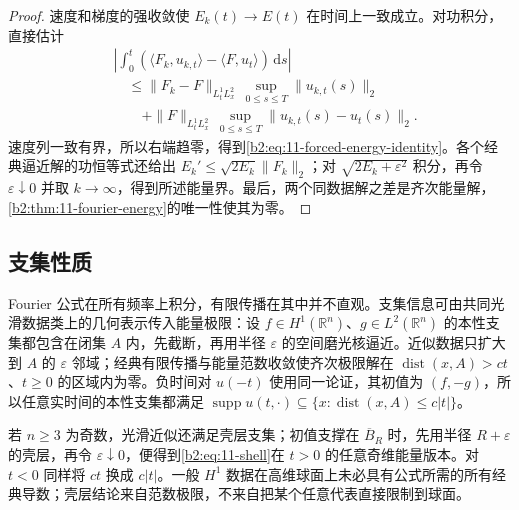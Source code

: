\begin{proof}
速度和梯度的强收敛使 \(E_k(t)\to E(t)\) 在时间上一致成立。对功积分，直接估计
\[
 \begin{aligned}
 &\left|\int_0^t\left(\langle F_k,u_{k,t}\rangle
                         -\langle F,u_t\rangle\right)\,\mathrm{d}s\right|\\
 &\quad\leq\|F_k-F\|_{L^1_tL^2_x}\,
                 \sup_{0\leq s\leq T}\|u_{k,t}(s)\|_2\\
 &\qquad+\|F\|_{L^1_tL^2_x}\,
                 \sup_{0\leq s\leq T}\|u_{k,t}(s)-u_t(s)\|_2.
 \end{aligned}
\]
速度列一致有界，所以右端趋零，得到\eqref{b2:eq:11-forced-energy-identity}。各个经典逼近解的功恒等式还给出 \(E_k'\leq\sqrt{2E_k}\|F_k\|_2\)；对 \(\sqrt{2E_k+\varepsilon^2}\) 积分，再令 \(\varepsilon\downarrow0\) 并取 \(k\to\infty\)，得到所述能量界。最后，两个同数据解之差是齐次能量解，\cref{b2:thm:11-fourier-energy}的唯一性使其为零。
\end{proof}

\subsection{支集性质}
\label{b2:subsec:110304}

Fourier 公式在所有频率上积分，有限传播在其中并不直观。支集信息可由共同光滑数据类上的几何表示传入能量极限：设 \(f\in H^1(\mathbb R^n)\)、\(g\in L^2(\mathbb R^n)\) 的本性支集都包含在闭集 \(A\) 内，先截断，再用半径 \(\varepsilon\) 的空间磨光核逼近。近似数据只扩大到 \(A\) 的 \(\varepsilon\) 邻域；经典有限传播与能量范数收敛使齐次极限解在 \(\operatorname{dist}(x,A)>ct\)、\(t\geq0\) 的区域内为零。负时间对 \(u(-t)\) 使用同一论证，其初值为 \((f,-g)\)，所以任意实时间的本性支集都满足 \(\operatorname{supp}u(t,\cdot)\subseteq\{x:\operatorname{dist}(x,A)\leq c|t|\}\)。

\ProseParagraphBreak

若 \(n\geq3\) 为奇数，光滑近似还满足壳层支集；初值支撑在 \(\overline B_R\) 时，先用半径 \(R+\varepsilon\) 的壳层，再令 \(\varepsilon\downarrow0\)，便得到\eqref{b2:eq:11-shell}在 \(t>0\) 的任意奇维能量版本。对 \(t<0\) 同样将 \(ct\) 换成 \(c|t|\)。一般 \(H^1\) 数据在高维球面上未必具有公式所需的所有经典导数；壳层结论来自范数极限，不来自把某个任意代表直接限制到球面。

\ProseParagraphBreak

